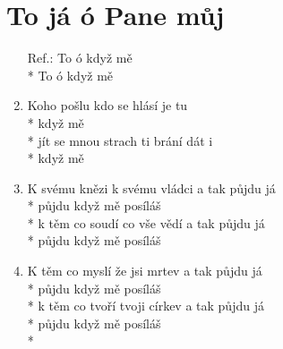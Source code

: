 \section{To já ó Pane můj}
\begin{enumerate}
\item[Ref.:]  To  ó    když mě  \\*
To  ó    když mě 
\item Koho pošlu kdo se hlásí je tu   \\*
 když mě  \\*
 jít se mnou strach ti brání dát i   \\*
 když mě  
\item K svému knězi k svému vládci a tak půjdu já \\*
půjdu když mě posíláš \\*
k těm co soudí co vše vědí a tak půjdu já \\*
půjdu když mě posíláš 
\item K těm co myslí že jsi mrtev a tak půjdu já \\*
půjdu když mě posíláš \\*
k těm co tvoří tvoji církev a tak půjdu já \\*
půjdu když mě posíláš \\*
\end{enumerate}

